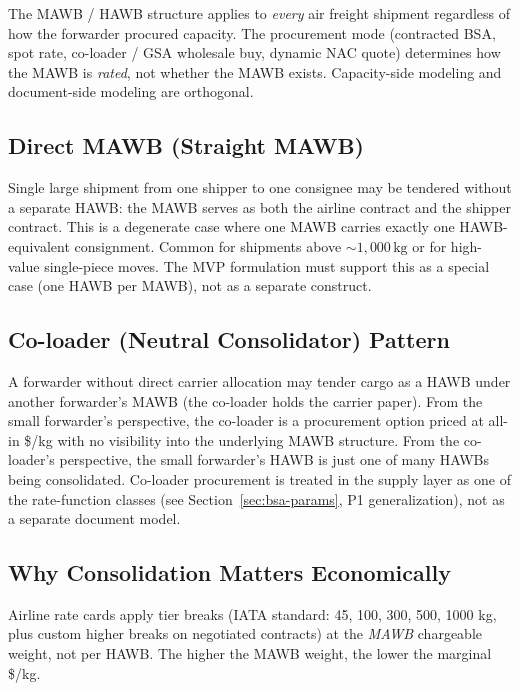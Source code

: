 \documentclass[11pt,a4paper]{article}
\theoremstyle{definition}
\begin{document}
The MAWB / HAWB structure applies to \emph{every} air freight shipment regardless of
how the forwarder procured capacity. The procurement mode (contracted BSA, spot rate,
co-loader / GSA wholesale buy, dynamic NAC quote) determines how the MAWB is
\emph{rated}, not whether the MAWB exists. Capacity-side modeling and document-side
modeling are orthogonal.

\subsection{Direct MAWB (Straight MAWB)}

Single large shipment from one shipper to one consignee may be tendered without a
separate HAWB: the MAWB serves as both the airline contract and the shipper contract.
This is a degenerate case where one MAWB carries exactly one HAWB-equivalent
consignment. Common for shipments above \(\sim 1{,}000\,\text{kg}\) or for high-value
single-piece moves. The MVP formulation must support this as a special case (one
HAWB per MAWB), not as a separate construct.

\subsection{Co-loader (Neutral Consolidator) Pattern}

A forwarder without direct carrier allocation may tender cargo as a HAWB under
another forwarder's MAWB (the co-loader holds the carrier paper). From the small
forwarder's perspective, the co-loader is a procurement option priced at all-in
\$/kg with no visibility into the underlying MAWB structure. From the co-loader's
perspective, the small forwarder's HAWB is just one of many HAWBs being consolidated.
Co-loader procurement is treated in the supply layer as one of the rate-function
classes (see Section~\ref{sec:bsa-params}, P1 generalization), not as a separate
document model.

\subsection{Why Consolidation Matters Economically}

Airline rate cards apply tier breaks (IATA standard: 45, 100, 300, 500, 1000 kg, plus
custom higher breaks on negotiated contracts) at the \emph{MAWB} chargeable weight,
not per HAWB. The higher the MAWB weight, the lower the marginal \$/kg.
\end{document}
